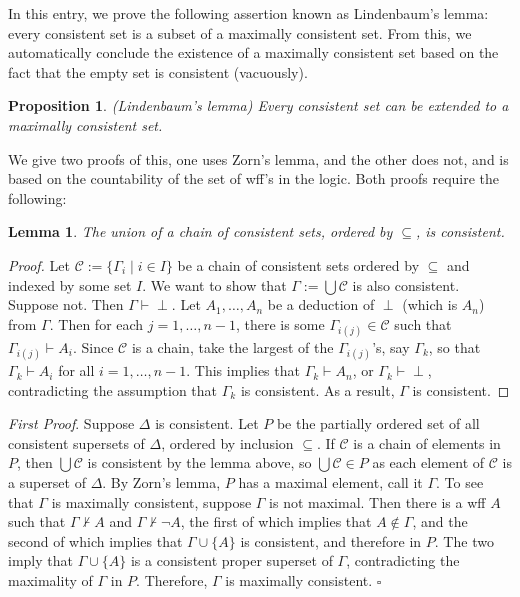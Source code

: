 \documentclass[12pt]{article}
\newtheorem{prop}{Proposition}
\newtheorem{lem}{Lemma}
\begin{document}
In this entry, we prove the following assertion known as Lindenbaum's lemma:  every consistent set is a subset of a maximally consistent set.  From this, we automatically conclude the existence of a maximally consistent set based on the fact that the empty set is consistent (vacuously).

\begin{prop} (Lindenbaum's lemma)  Every consistent set can be extended to a maximally consistent set. \end{prop}
We give two proofs of this, one uses Zorn's lemma, and the other does not, and is based on the countability of the set of wff's in the logic.  Both proofs require the following:

\begin{lem} The union of a chain of consistent sets, ordered by $\subseteq$, is consistent. \end{lem}
\begin{proof}  Let $\mathcal{C}:=\lbrace \Gamma_i \mid i\in I\rbrace$ be a chain of consistent sets ordered by $\subseteq$ and indexed by some set $I$.  We want to show that $\Gamma:=\bigcup \mathcal{C}$ is also consistent.  Suppose not.  Then $\Gamma \vdash \perp$.  Let $A_1,\ldots, A_n$ be a deduction of $\perp$ (which is $A_n$) from $\Gamma$.  Then for each $j=1,\ldots,n-1$, there is some $\Gamma_{i(j)} \in \mathcal{C}$ such that $\Gamma_{i(j)} \vdash A_i$.  Since $\mathcal{C}$ is a chain, take the largest of the $\Gamma_{i(j)}$'s, say $\Gamma_k$, so that $\Gamma_k \vdash A_i$ for all $i=1,\ldots,n-1$.  This implies that $\Gamma_k \vdash A_n$, or $\Gamma_k \vdash \perp$, contradicting the assumption that $\Gamma_k$ is consistent.  As a result, $\Gamma$ is consistent.
\end{proof}

\textit{First Proof}.  Suppose $\Delta$ is consistent.  Let $P$ be the partially ordered set of all consistent supersets of $\Delta$, ordered by inclusion $\subseteq$.  If $\mathcal{C}$ is a chain of elements in $P$, then $\bigcup \mathcal{C}$ is consistent by the lemma above, so $\bigcup \mathcal{C} \in P$ as each element of $\mathcal{C}$ is a superset of $\Delta$.  By Zorn's lemma, $P$ has a maximal element, call it $\Gamma$.  To see that $\Gamma$ is maximally consistent, suppose $\Gamma$ is not maximal.  Then there is a wff $A$ such that $\Gamma \not\vdash A$ and $\Gamma \not\vdash \neg A$, the first of which implies that $A\notin \Gamma$, and the second of which implies that $\Gamma\cup \lbrace A\rbrace$ is consistent, and therefore in $P$.  The two imply that $\Gamma\cup\lbrace A\rbrace$ is a consistent proper superset of $\Gamma$, contradicting the maximality of $\Gamma$ in $P$. Therefore, $\Gamma$ is maximally consistent.  \hfill $\square$
\end{document}
